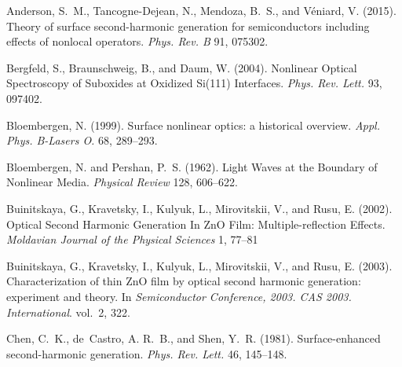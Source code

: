 \documentclass[utf8]{frontiersSCNS}
\begin{document}
\begin{thebibliography}{40}
Anderson, S.~M., Tancogne-Dejean, N., Mendoza, B.~S., and V{\'e}niard, V.
  (2015).
\newblock Theory of surface second-harmonic generation for semiconductors
  including effects of nonlocal operators.
\newblock \emph{Phys. Rev. B} 91, 075302.
\newblock {}

Bergfeld, S., Braunschweig, B., and Daum, W. (2004).
\newblock Nonlinear {Optical} {Spectroscopy} of {Suboxides} at {Oxidized}
  {Si}(111) {Interfaces}.
\newblock \emph{Phys. Rev. Lett.} 93, 097402.
\newblock {}

Bloembergen, N. (1999).
\newblock Surface nonlinear optics: a historical overview.
\newblock \emph{Appl. Phys. B-Lasers O.} 68, 289--293.
\newblock {}

Bloembergen, N. and Pershan, P.~S. (1962).
\newblock Light {Waves} at the {Boundary} of {Nonlinear} {Media}.
\newblock \emph{Physical Review} 128, 606--622.
\newblock {}

Buinitskaya, G., Kravetsky, I., Kulyuk, L., Mirovitskii, V., and Rusu, E.
  (2002).
\newblock Optical {Second} {Harmonic} {Generation} {In} {ZnO} {Film}:
  {Multiple}-reflection {Effects}.
\newblock \emph{Moldavian Journal of the Physical Sciences} 1, 77--81

Buinitskaya, G., Kravetsky, I., Kulyuk, L., Mirovitskii, V., and Rusu, E.
  (2003).
\newblock Characterization of thin {ZnO} film by optical second harmonic
  generation: experiment and theory.
\newblock In \emph{Semiconductor Conference, 2003. CAS 2003. International}.
  vol.~2, 322.
\newblock {}

Chen, C.~K., de~Castro, A. R.~B., and Shen, Y.~R. (1981).
\newblock Surface-enhanced second-harmonic generation.
\newblock \emph{Phys. Rev. Lett.} 46, 145--148.
\newblock {}


\end{thebibliography}
\end{document}
